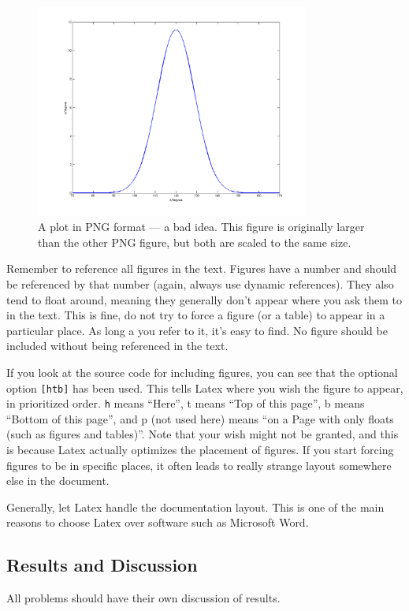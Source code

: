 \begin{figure}[htb]
	\centering
		\includegraphics[width=0.8\textwidth]{figures/constraint_png_large.png}
	\caption{A plot in PNG format --- a bad idea. This figure is originally larger than the other PNG figure, but both are scaled to the same size.}
\label{fig:constraint_png_large}
\end{figure}



Remember to reference all figures in the text. Figures have a number and should be referenced by that number (again, always use dynamic references). They also tend to float around, meaning they generally don't appear where you ask them to in the text. This is fine, do not try to force a figure (or a table) to appear in a particular place. As long a you refer to it, it's easy to find. No figure should be included without being referenced in the text.

If you look at the source code for including figures, you can see that the optional option \verb+[htb]+ has been used. This tells Latex where you wish the figure to appear, in prioritized order. \verb+h+ means ``Here'', t means ``Top of this page'', b means ``Bottom of this page'', and p (not used here) means ``on a Page with only floats (such as figures and tables)''. Note that your wish might not be granted, and this is because Latex actually optimizes the placement of figures. If you start forcing figures to be in specific places, it often leads to really strange layout somewhere else in the document. 

Generally, let Latex handle the documentation layout. This is one of the main reasons to choose Latex over software such as Microsoft Word.

\subsection{Results and Discussion}
All problems should have their own discussion of results. 

